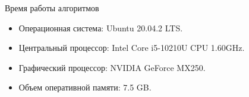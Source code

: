\documentclass{beamer}
\begin{document}
\newcommand{\backupbegin}{\setcounter{framenumber}{16}}
\newcommand{\backupend}{\setcounter{framenumber}{16}}
\appendix
\backupbegin
\begin{frame}{Время работы алгоритмов}
\begin{itemize}
    \item Операционная система: Ubuntu 20.04.2 LTS.
    \item Центральный процессор: Intel Core i5-10210U CPU 1.60GHz.
    \item Графический процессор: NVIDIA GeForce MX250.
    \item Объем оперативной памяти: 7.5 GB.
\end{itemize}

\end{frame}
\backupend
\end{document}
